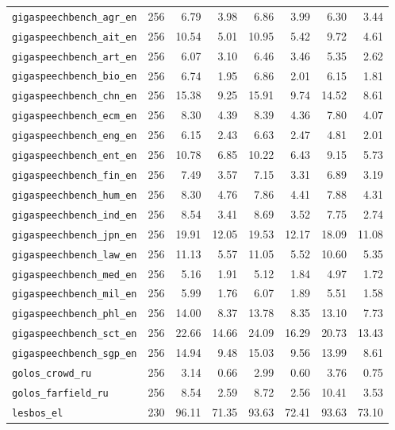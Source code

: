 \begin{table}[!ht]
\begin{tabular}{lrrrrrrr}
\texttt{gigaspeechbench\_agr\_en} & 256 & 6.79 & 3.98 & 6.86 & 3.99 & 6.30 & 3.44\\
\texttt{gigaspeechbench\_ait\_en} & 256 & 10.54 & 5.01 & 10.95 & 5.42 & 9.72 & 4.61\\
\texttt{gigaspeechbench\_art\_en} & 256 & 6.07 & 3.10 & 6.46 & 3.46 & 5.35 & 2.62\\
\texttt{gigaspeechbench\_bio\_en} & 256 & 6.74 & 1.95 & 6.86 & 2.01 & 6.15 & 1.81\\
\texttt{gigaspeechbench\_chn\_en} & 256 & 15.38 & 9.25 & 15.91 & 9.74 & 14.52 & 8.61\\
\texttt{gigaspeechbench\_ecm\_en} & 256 & 8.30 & 4.39 & 8.39 & 4.36 & 7.80 & 4.07\\
\texttt{gigaspeechbench\_eng\_en} & 256 & 6.15 & 2.43 & 6.63 & 2.47 & 4.81 & 2.01\\
\texttt{gigaspeechbench\_ent\_en} & 256 & 10.78 & 6.85 & 10.22 & 6.43 & 9.15 & 5.73\\
\texttt{gigaspeechbench\_fin\_en} & 256 & 7.49 & 3.57 & 7.15 & 3.31 & 6.89 & 3.19\\
\texttt{gigaspeechbench\_hum\_en} & 256 & 8.30 & 4.76 & 7.86 & 4.41 & 7.88 & 4.31\\
\texttt{gigaspeechbench\_ind\_en} & 256 & 8.54 & 3.41 & 8.69 & 3.52 & 7.75 & 2.74\\
\texttt{gigaspeechbench\_jpn\_en} & 256 & 19.91 & 12.05 & 19.53 & 12.17 & 18.09 & 11.08\\
\texttt{gigaspeechbench\_law\_en} & 256 & 11.13 & 5.57 & 11.05 & 5.52 & 10.60 & 5.35\\
\texttt{gigaspeechbench\_med\_en} & 256 & 5.16 & 1.91 & 5.12 & 1.84 & 4.97 & 1.72\\
\texttt{gigaspeechbench\_mil\_en} & 256 & 5.99 & 1.76 & 6.07 & 1.89 & 5.51 & 1.58\\
\texttt{gigaspeechbench\_phl\_en} & 256 & 14.00 & 8.37 & 13.78 & 8.35 & 13.10 & 7.73\\
\texttt{gigaspeechbench\_sct\_en} & 256 & 22.66 & 14.66 & 24.09 & 16.29 & 20.73 & 13.43\\
\texttt{gigaspeechbench\_sgp\_en} & 256 & 14.94 & 9.48 & 15.03 & 9.56 & 13.99 & 8.61\\
\texttt{golos\_crowd\_ru} & 256 & 3.14 & 0.66 & 2.99 & 0.60 & 3.76 & 0.75\\
\texttt{golos\_farfield\_ru} & 256 & 8.54 & 2.59 & 8.72 & 2.56 & 10.41 & 3.53\\
\texttt{lesbos\_el} & 230 & 96.11 & 71.35 & 93.63 & 72.41 & 93.63 & 73.10\\

\end{tabular}
\end{table}
